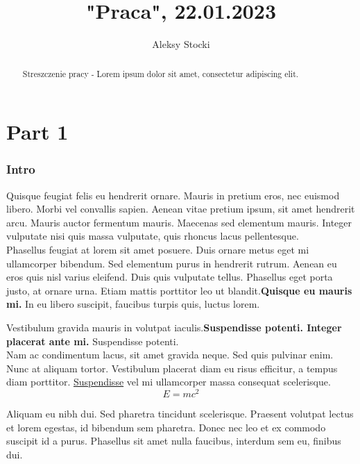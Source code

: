 \documentclass[12pt,a4paper]{article}
\title{"Praca", 22.01.2023}
\author{Aleksy Stocki}
\begin{document}
\maketitle

\begin{abstract}
Streszczenie pracy - Lorem ipsum dolor sit amet, consectetur adipiscing elit.
\end{abstract}

\newpage

\tableofcontents
\listoftables
\listoffigures

\newpage

\part {Part 1}

\section{Intro}
Quisque feugiat felis eu hendrerit ornare. Mauris in pretium eros, nec euismod libero. Morbi vel convallis sapien. Aenean vitae pretium ipsum, sit amet hendrerit arcu. Mauris auctor fermentum mauris. Maecenas sed elementum mauris. Integer vulputate nisi quis massa vulputate, quis rhoncus lacus pellentesque. \\Phasellus feugiat at lorem sit amet posuere. Duis ornare metus eget mi ullamcorper bibendum. Sed elementum purus in hendrerit rutrum. Aenean eu eros quis nisl varius eleifend. Duis quis vulputate tellus. Phasellus eget porta justo, at ornare urna. Etiam mattis porttitor leo ut blandit.\textbf{Quisque eu mauris mi.} In eu libero suscipit, faucibus turpis quis, luctus lorem.

Vestibulum gravida mauris in volutpat iaculis.\textbf{Suspendisse potenti. Integer placerat ante mi.} Suspendisse potenti.\\Nam ac condimentum lacus, sit amet gravida neque. Sed quis pulvinar enim. Nunc at aliquam tortor. Vestibulum placerat diam eu risus efficitur, a tempus diam porttitor. \underline{Suspendisse} vel mi ullamcorper massa consequat scelerisque.
\[E=mc^2\]

Aliquam eu nibh dui. Sed pharetra tincidunt scelerisque. Praesent volutpat lectus et lorem egestas, id bibendum sem pharetra. Donec nec leo et ex commodo suscipit id a purus. Phasellus sit amet nulla faucibus, interdum sem eu, finibus dui.
\end{document}
